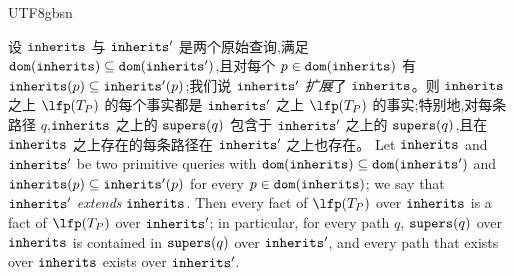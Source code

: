 \begin{CJK*}{UTF8}{gbsn}
\begin{lemma}\label{lem:program-monotonicity}
\ifPaperChinese
设 $\mathtt{inherits}$ 与 $\mathtt{inherits}'$ 是两个原始查询,满足 $\mathtt{dom}(\mathtt{inherits}) \subseteq \mathtt{dom}(\mathtt{inherits}')$,且对每个 $p \in \mathtt{dom}(\mathtt{inherits})$ 有 $\mathtt{inherits}(p) \subseteq \mathtt{inherits}'(p)$;我们说 $\mathtt{inherits}'$ \emph{扩展}了 $\mathtt{inherits}$。则 $\mathtt{inherits}$ 之上 $\lfp(T_P)$ 的每个事实都是 $\mathtt{inherits}'$ 之上 $\lfp(T_P)$ 的事实;特别地,对每条路径 $q$,$\mathtt{inherits}$ 之上的 $\mathtt{supers}(q)$ 包含于 $\mathtt{inherits}'$ 之上的 $\mathtt{supers}(q)$,且在 $\mathtt{inherits}$ 之上存在的每条路径在 $\mathtt{inherits}'$ 之上也存在。
\else
Let $\mathtt{inherits}$ and $\mathtt{inherits}'$ be two primitive queries with
$\mathtt{dom}(\mathtt{inherits}) \subseteq \mathtt{dom}(\mathtt{inherits}')$ and $\mathtt{inherits}(p) \subseteq \mathtt{inherits}'(p)$ for every
$p \in \mathtt{dom}(\mathtt{inherits})$; we say that $\mathtt{inherits}'$ \emph{extends} $\mathtt{inherits}$. Then every fact of
$\lfp(T_P)$ over $\mathtt{inherits}$ is a fact of $\lfp(T_P)$ over $\mathtt{inherits}'$; in particular, for every
path $q$, $\mathtt{supers}(q)$ over $\mathtt{inherits}$ is contained in $\mathtt{supers}(q)$ over $\mathtt{inherits}'$, and every path
that exists over $\mathtt{inherits}$ exists over $\mathtt{inherits}'$.
\fi
\end{lemma}


\end{CJK*}
